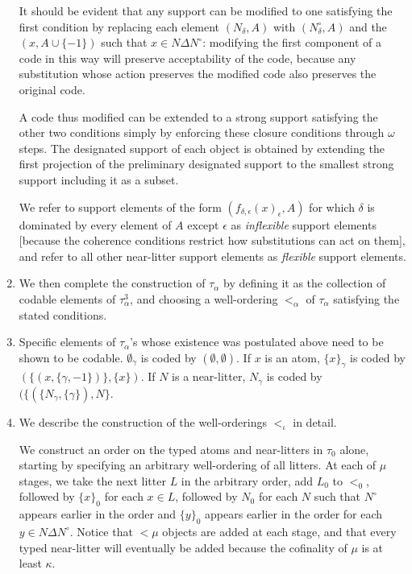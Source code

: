 \documentclass[12pt]{article}
\begin{document}
\begin{enumerate}
\begin{enumerate}
\end{enumerate}  It should be evident that any support can be modified to one satisfying the first condition by replacing each element
$(N_\delta,A)$ with $(N^\circ_\delta,A)$ and the $(x,A\cup \{-1\})$ such that $x \in N \Delta N^\circ$:  modifying the first component of a code
in this way will preserve acceptability of the code, because any substitution whose action preserves the modified code also preserves the original code.

A code thus modified can be extended to a strong support satisfying the other two conditions simply by enforcing these closure conditions through $\omega$ steps.  The designated support of each object is obtained by extending the first projection
of the preliminary designated support to the smallest strong support including  it as a subset.

We refer to support elements of the form $(f_{\delta,\epsilon}(x)_\epsilon,A)$ for which $\delta$ is dominated by every element of $A$ except $\epsilon$ as {\em inflexible\/} support elements [because the coherence conditions restrict how substitutions can act on them], and refer to all other near-litter support elements as {\em flexible\/} support elements.

\item  We then complete the construction of $\tau_\alpha$ by defining it as the collection of codable elements of $\tau^3_\alpha$, and choosing a well-ordering $<_\alpha$ of $\tau_\alpha$ satisfying the stated conditions.

\item Specific elements of $\tau_\alpha$'s whose existence was postulated above need to be shown to be codable.  $\emptyset_\gamma$ is coded by $(\emptyset,\emptyset)$.  If $x$ is an atom, $\{x\}_\gamma$ is coded by $(\{(x,\{\gamma,-1\})\},\{x\})$.  If $N$ is a near-litter,
$N_\gamma$ is coded by $(\{(\{N_\gamma,\{\gamma\}),N\}$.

\item  We describe the construction of the well-orderings $<_\iota$ in detail.

We construct an order on the typed atoms and near-litters in $\tau_0$ alone, starting by specifying an arbitrary well-ordering of all litters.  At each of $\mu$ stages,
we take the next litter $L$ in the arbitrary order, add $L_0$ to $<_0$, followed by $\{x\}_0$ for each $x \in L$, followed by $N_0$ for each $N$ such that $N^{\circ}$
appears earlier in the order and $\{y\}_0$ appears earlier in the order for each $y \in N \Delta N^\circ$.  Notice that $<\mu$ objects are added at each stage, and that every typed near-litter will eventually be added because the cofinality of $\mu$ is at least $\kappa$.


\end{enumerate}
\end{document}
